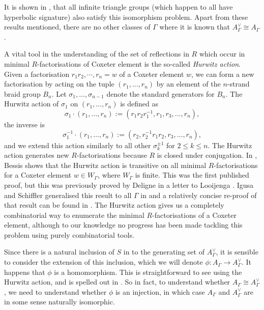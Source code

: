 It is shown in \cite{delucchi_etal_dual_2024}, that all infinite triangle groups (which happen to all have hyperbolic signature) also satisfy this isomorphism problem.
Apart from these results mentioned, there are no other classes of $\Gamma$ where it is known that $A^\vee_\Gamma \cong A_\Gamma$.

A vital tool in the understanding of the set of reflections in $R$ which occur in minimal $R$-factorisations of Coxeter element is the so-called \emph{Hurwitz action}.
Given a factorisation $r_1r_2, \cdots ,r_n=w$ of a Coxeter element $w$, we can form a new factorisation by acting on the tuple  $(r_1, \ldots, r_n)$ by an element of the $n$-strand braid group  $B_n$.
Let  $\sigma_1, \ldots , \sigma_{n-1}$ denote the standard generators for $B_n$.
The Hurwitz action of  $\sigma_1$ on  $(r_1, \ldots, r_n)$ is defined as
\[
	\sigma_1 \cdot (r_1, \ldots, r_n) := (r_1r_2r_1^{-1}, r_1, r_3, \ldots, r_n)
	,\]
the inverse is
\[
	\sigma_1^{-1} \cdot (r_1, \ldots, r_n) := (r_2, r_2^{-1}r_1r_2, r_3, \ldots, r_n)
	,\]
and we extend this action similarly to all other $\sigma_k^{\pm 1}$ for  $2\leq k \leq n$.
The Hurwitz action generates new  $R$-factorisations because  $R$ is closed under conjugation.
In \cite{bessis_dual_2003}, Bessis shows that the Hurwitz action is transitive on all minimal  $R$-factorisations for a Coxeter element  $w \in W_\Gamma$, where  $W_\Gamma$ is finite.
This was the first published proof, but this was previously proved by Deligne in a letter to Looijenga \cite{deligne_letter_1974}.
Igusa and Schiffler generalised this result to all $\Gamma$ in \cite{igusa_schiffler_exceptional_2010} and a relatively concise re-proof of that result can be found in \cite{baumeister_etal_note_2014}.
The Hurwitz action gives us a completely combinatorial way to enumerate the minimal $R$-factorisations of a Coxeter element, although to our knowledge no progress has been made tackling this problem using purely combinatorial tools.

Since there is a natural inclusion of $S$ in to the generating set of  $A^\vee_\Gamma$, it is sensible to consider the extension of this inclusion, which we will denote $\phi \colon A_\Gamma \to A^\vee_\Gamma$.
It happens that $\phi$ is a homomorphism.
This is straightforward to see using the Hurwitz action, and is spelled out in \cite[Proposition 10.1]{mccammond_sulway_artin_2017}.
So in fact, to understand whether $A_\Gamma \cong A^\vee_\Gamma$, we need to understand whether $\phi$ is an injection, in which case $A_\Gamma$ and  $A^\vee_\Gamma$ are in some sense naturally isomorphic.

